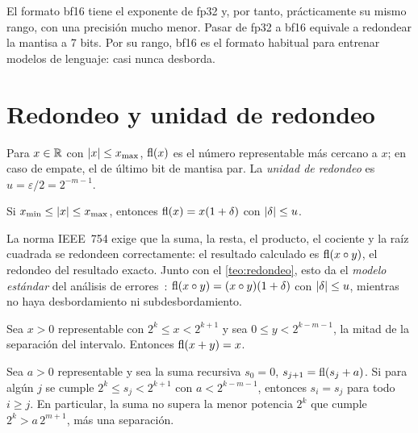 El formato bf16 tiene el exponente de fp32 y, por tanto, prácticamente su mismo rango, con una precisión mucho menor. Pasar de fp32 a bf16 equivale a redondear la mantisa a 7 bits. Por su rango, bf16 es el formato habitual para entrenar modelos de lenguaje: casi nunca desborda.

\section{Redondeo y unidad de redondeo}

\begin{definicion}\label{def:fl}
Para $x\in\mathbb{R}$ con $\lvert x\rvert\le x_{\max}$, $\operatorname{fl}(x)$ es el número representable más cercano a $x$; en caso de empate, el de último bit de mantisa par. La \emph{unidad de redondeo} es $u=\varepsilon/2=2^{-m-1}$.
\end{definicion}

\begin{teorema}\label{teo:redondeo}
Si $x_{\min}\le\lvert x\rvert\le x_{\max}$, entonces $\operatorname{fl}(x)=x(1+\delta)$ con $\lvert\delta\rvert\le u$.
\end{teorema}

La norma IEEE~754 exige que la suma, la resta, el producto, el cociente y la raíz cuadrada se redondeen correctamente: el resultado calculado es $\operatorname{fl}(x\circ y)$, el redondeo del resultado exacto. Junto con el \cref{teo:redondeo}, esto da el \emph{modelo estándar} del análisis de errores~\cite{higham,goldberg}: $\operatorname{fl}(x\circ y)=(x\circ y)(1+\delta)$ con $\lvert\delta\rvert\le u$, mientras no haya desbordamiento ni subdesbordamiento.

\begin{lema}[Absorción]\label{lem:absorcion}
Sea $x>0$ representable con $2^{k}\le x<2^{k+1}$ y sea $0\le y<2^{k-m-1}$, la mitad de la separación del intervalo. Entonces $\operatorname{fl}(x+y)=x$.
\end{lema}

\begin{corolario}\label{cor:estancamiento}
Sea $a>0$ representable y sea la suma recursiva $s_0=0$, $s_{j+1}=\operatorname{fl}(s_j+a)$. Si para algún $j$ se cumple $2^{k}\le s_j<2^{k+1}$ con $a<2^{k-m-1}$, entonces $s_i=s_j$ para todo $i\ge j$. En particular, la suma no supera la menor potencia $2^{k}$ que cumple $2^{k}>a\,2^{m+1}$, más una separación.
\end{corolario}

